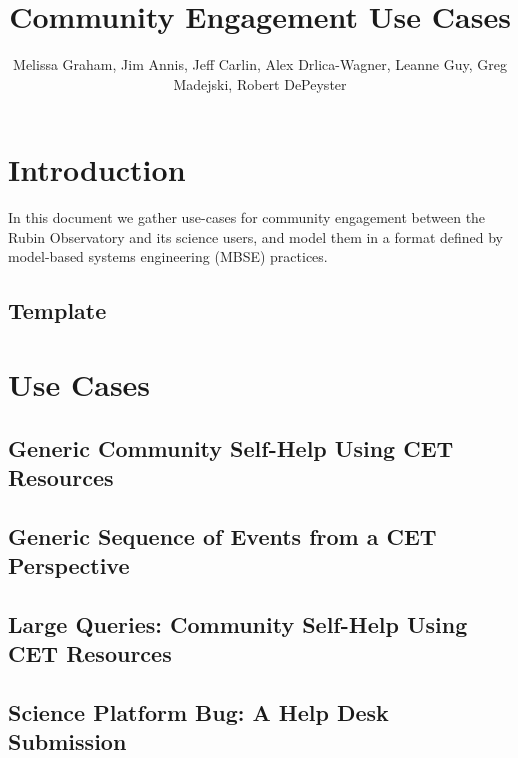 \documentclass[DM,lsstdraft,authoryear,toc]{lsstdoc}
\title{Community Engagement Use Cases}
\author{%
Melissa Graham,  Jim Annis, Jeff Carlin, Alex Drlica-Wagner, Leanne Guy, Greg Madejski, Robert DePeyster
}
\date{\vcsDate}
\begin{document}
\maketitle



\section{Introduction}

In this document we gather use-cases for community engagement between the Rubin Observatory and its science users, and model them in a format defined by model-based systems engineering (MBSE) practices.

\clearpage
\subsection{Template}


\clearpage
\section{Use Cases}

\clearpage
\subsection{Generic Community Self-Help Using CET Resources}


\clearpage
\subsection{Generic Sequence of Events from a CET Perspective}


\clearpage
\subsection{Large Queries: Community Self-Help Using CET Resources}

\clearpage
\subsection{Science Platform Bug: A Help Desk Submission}
\end{document}

